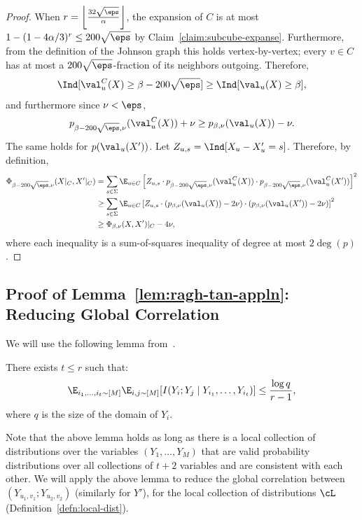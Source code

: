 \begin{proof}
When $r = \left\lfloor\frac{32\sqrt{\eps}}{\alpha}\right\rfloor$, the expansion of $C$ is at most $1 - (1-4\alpha/3)^r \le 200\sqrt{\eps}$ by Claim~\ref{claim:subcube-expanse}.
Furthermore, from the definition of the Johnson graph this holds vertex-by-vertex; every $v \in C$ has at most a $200\sqrt{\eps}$-fraction of its neighbors outgoing.
Therefore,
\[
\Ind[\val_u^C(X) \ge \beta - 200\sqrt{\eps}] \ge \Ind[\val_u(X) \ge \beta],
\]
and furthermore since $\nu < \eps$,
\[
p_{\beta - 200 \sqrt{\eps},\nu}(\val_u^C(X)) + \nu \ge p_{\beta,\nu}(\val_u(X)) - \nu.
\]
The same holds for $p(\val_u(X'))$. Let $Z_{u,s} = \Ind[X_u - X'_u = s]$. Therefore, by definition,
\begin{align*}
    \Phi_{\beta - 200\sqrt{\eps},\nu}(X|_C,X'|_C)
    &= \sum_{s \in \Sigma} \E_{u \in C}\left[Z_{u,s}\cdot p_{\beta-200\sqrt{\eps},\nu}(\val_u^C(X))\cdot p_{\beta-200\sqrt{\eps},\nu}(\val_u^C(X'))\right]^2\\
    &\ge \sum_{s \in \Sigma} \E_{u \in C}\left[Z_{u,s}\cdot (p_{\beta,\nu}(\val_u(X)) - 2\nu)\cdot (p_{\beta,\nu}(\val_u(X')) - 2\nu)\right]^2\\
    &\ge \Phi_{\beta,\nu}(X,X')|_C - 4\nu,
\end{align*}
where each inequality is a sum-of-squares inequality of degree at most $2\deg(p)$.
\end{proof}








\subsection{Proof of Lemma~\ref{lem:ragh-tan-appln}: Reducing Global Correlation}\label{sec:ragh}
We will use the following lemma from~\cite{RT12}.

\begin{lemma}\label{lem:ragh-tan}
There exists $t \leq r$ such that: 
\[\E_{i_1,\ldots,i_t \sim [M]}\E_{i,j \sim [M]}[I(Y_i;Y_j \mid Y_{i_1}, \ldots,Y_{i_t})] \leq \frac{\log q}{r - 1},\]
where $q$ is the size of the domain of $Y_i$.
\end{lemma}

Note that the above lemma holds as long as there is a local collection of distributions over the variables $(Y_1,\ldots,Y_M)$ that are valid probability distributions over all collections of $t+2$ variables and are consistent with each other. We will apply the above lemma to reduce the global correlation between $(Y_{u_1,v_1};Y_{u_2,v_2})$ (similarly for $Y'$), for the local collection of distributions $\cL$ (Definition~\ref{defn:local-dist}).


